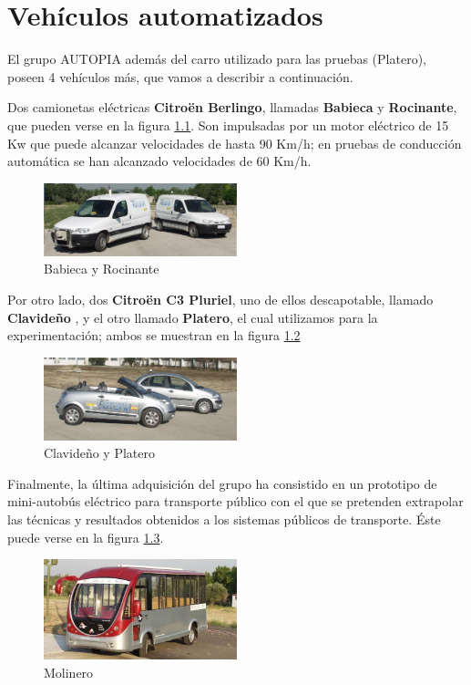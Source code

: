 \chapter{Vehículos automatizados}
\label{ape:carros}

El grupo AUTOPIA además del carro utilizado para las pruebas (Platero), poseen 4 vehículos más, que vamos a describir a continuación.

Dos camionetas eléctricas \textbf{Citroën Berlingo}, llamadas \textbf{Babieca} y \textbf{Rocinante}, que pueden verse en la figura \ref{fig:furgonetas}. Son impulsadas por un motor eléctrico de 15 Kw que puede alcanzar velocidades de hasta 90 Km/h; en pruebas de conducción automática se han alcanzado velocidades de 60 Km/h.

\begin{figure}[htb]
  \centering
  \includegraphics[width=0.5\textwidth]{figures/furgonetas.jpg}
  \caption{Babieca y Rocinante}
  \label{fig:furgonetas}
\end{figure}

Por otro lado, dos \textbf{Citroën C3 Pluriel}, uno de ellos descapotable, llamado \textbf{Clavideño} \cite{milanesCl}, y el otro llamado \textbf{Platero}, el cual utilizamos para la experimentación; ambos se muestran en la figura \ref{fig:c3s}

\begin{figure}[htb]
  \centering
  \includegraphics[width=0.5\textwidth]{figures/c3s.jpg}
  \caption{Clavideño y Platero}
  \label{fig:c3s}
\end{figure}

Finalmente, la última adquisición del grupo ha consistido en un prototipo de mini-autobús eléctrico para transporte público con el que se pretenden extrapolar las técnicas y resultados obtenidos a los sistemas públicos de transporte. Éste puede verse en la figura \ref{fig:molinero}.

\begin{figure}[htb]
  \centering
  \includegraphics[width=0.5\textwidth]{figures/molinero.jpg}
  \caption{Molinero}
  \label{fig:molinero}
\end{figure}

